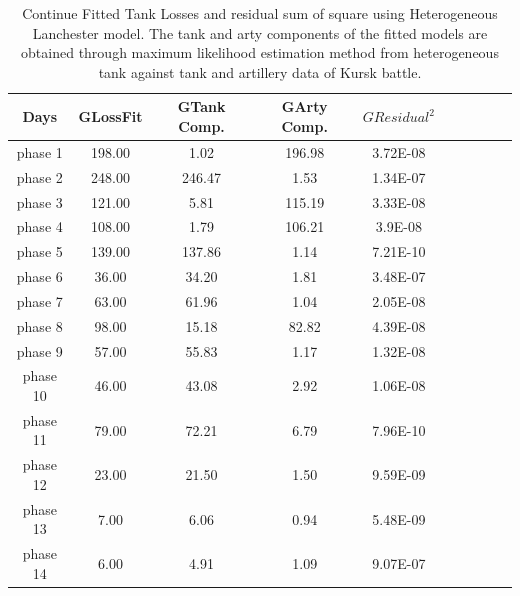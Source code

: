 \documentclass[]{article}
\begin{document}
\begin{table}
\tiny
\caption{Continue Fitted Tank Losses and residual sum of square using Heterogeneous Lanchester model. The tank and arty components of the fitted models are obtained through maximum likelihood estimation method from heterogeneous tank against tank and artillery data of Kursk battle.}
{\begin{tabular}{|c|c|c|c|c|c|c|c|c|c|}   \hline\hline
Days & GLossFit	&GTank Comp.	&GArty Comp.	& $GResidual^2$ \\
\hline
\hline
phase 1&		198.00&	1.02&	196.98&	3.72E-08\\\hline
phase 2	&	248.00&	246.47&	1.53&	1.34E-07\\\hline
phase 3	&	121.00&	5.81	&115.19	&3.33E-08\\\hline
phase 4	&	108.00&	1.79&	106.21&	3.9E-08\\\hline
phase 5	&	139.00&	137.86	&1.14&	7.21E-10\\\hline
phase 6	&	36.00	&34.20&	1.81&	3.48E-07\\\hline
phase 7	&	63.00	&61.96	&1.04&	2.05E-08\\\hline
phase 8	&	98.00	&15.18&	82.82	&4.39E-08\\\hline
phase 9	&	57.00	&55.83&	1.17	&1.32E-08\\\hline
phase 10&	46.00	&43.08&	2.92&	1.06E-08\\\hline
phase 11&	79.00	&72.21	&6.79&	7.96E-10\\\hline
phase 12&	23.00&	21.50&	1.50&	9.59E-09\\\hline
phase 13&	7.00&	6.06	&0.94	&5.48E-09\\\hline
phase 14&	6.00&	4.91&	1.09&	9.07E-07\\\hline

\hline

\end{tabular}}\label{landtab}
\end{table}
\end{document}
